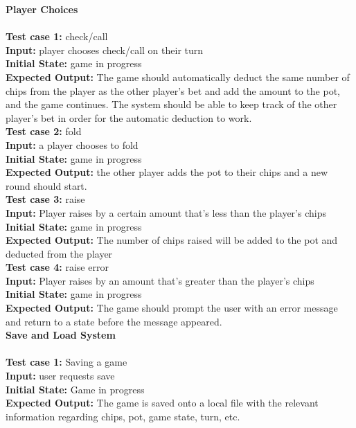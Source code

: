 \documentclass[12pt]{article}
\begin{document}
    \noindent \textbf{Player Choices }\\
    \\
    \textbf{Test case 1:} check/call\\ 
    \textbf{Input:} player chooses check/call on their turn\\
    \textbf{Initial State:} game in progress\\
	\textbf{Expected Output: }The game should automatically deduct the same number of chips from the player as the other player’s bet and add the amount to the pot, and the game continues. The system should be able to keep track of the other player’s bet in order for the automatic deduction to work. \\

	 \noindent \textbf{Test case 2:} fold\\
	\textbf{Input:} a player chooses to fold\\
	\textbf{Initial State:} game in progress\\
	\textbf{Expected Output:} the other player adds the pot to their chips and a new round should start.\\
 
    \noindent \textbf{Test case 3:} raise \\
    \textbf{Input:} Player raises by a certain amount that’s less than the player’s chips\\
    \textbf{Initial State: }game in progress\\
	\textbf{Expected Output:} The number of chips raised will be added to the pot and deducted from
the player\\
    
    \noindent \textbf {Test case 4:} raise error \\
    \textbf{Input:} Player raises by an amount that’s greater than the player’s chips\\
	\textbf{Initial State:} game in progress\\
	\textbf{Expected Output:} The game should prompt the user with an error message and return to
	a state before the message appeared.\\
	
	\noindent \textbf{Save and Load System} \\
	\\
	\noindent \textbf{Test case 1:} Saving a game\\
	\textbf{Input:} user requests save\\
	\textbf{Initial State:} Game in progress\\
	\textbf{Expected Output:} The game is saved onto a local file with the relevant information regarding chips, pot, game state, turn, etc. 
	
\end{document}
